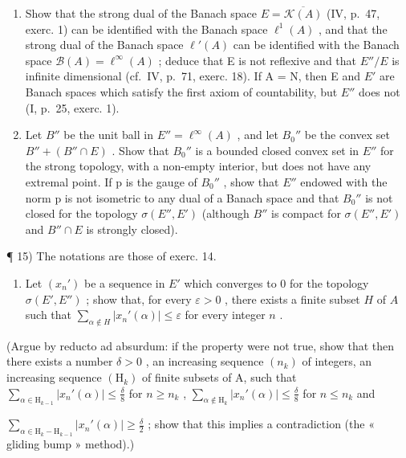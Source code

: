 \begin{enumerate}
\def\labelenumi{\alph{enumi})}
\tightlist
\item
  Show that the strong dual of the Banach space \(E = \overline{\mathcal{K}(A)}\) (IV, p.~47, exerc. 1) can be identified with the Banach space \(\ell^{1}(A)\) , and that the strong dual of the Banach space \(\ell'(A)\) can be identified with the Banach space \(\mathcal{B}(A) = \ell^{\infty}(A)\) ; deduce that E is not reflexive and that \(E''/E\) is infinite dimensional (cf.~IV, p.~71, exerc. 18). If A = N, then E and \(E'\) are Banach spaces which satisfy the first axiom of countability, but \(E''\) does not (I, p.~25, exerc. 1).
\item
  Let \(B''\) be the unit ball in \(E'' = \ell^{\infty}(A)\) , and let \(B_{0}''\) be the convex set \(B'' + (B'' \cap E)\) . Show that \(B_{0}''\) is a bounded closed convex set in \(E''\) for the strong topology, with a non-empty interior, but does not have any extremal point. If p is the gauge of \(B_{0}''\) , show that \(E''\) endowed with the norm p is not isometric to any dual of a Banach space and that \(B_{0}''\) is not closed for the topology \(\sigma(E'', E')\) (although \(B''\) is compact for \(\sigma(E'', E')\) and \(B'' \cap E\) is strongly closed).
\end{enumerate}

¶ 15) The notations are those of exerc. 14.

\begin{enumerate}
\def\labelenumi{\alph{enumi})}
\tightlist
\item
  Let \((x_n')\) be a sequence in \(E'\) which converges to 0 for the topology \(\sigma(E', E'')\) ; show that, for every \(\varepsilon > 0\) , there exists a finite subset \(H\) of \(A\) such that \(\sum_{\alpha \notin H} |x_n'(\alpha)| \leqslant \varepsilon\) for every integer \(n\) .
\end{enumerate}

(Argue by reducto ad absurdum: if the property were not true, show that then there exists a number \(\delta > 0\) , an increasing sequence \((n_k)\) of integers, an increasing sequence \((\mathrm{H}_k)\) of finite subsets of A, such that \(\sum_{\alpha \in \mathrm{H}_{k-1}} |x_n'(\alpha)| \leqslant \frac{\delta}{8}\) for \(n \geqslant n_k\) , \(\sum_{\alpha \notin \mathrm{H}_k} |x_n'(\alpha)| \leqslant \frac{\delta}{8}\) for \(n \leqslant n_k\) and

\(\sum_{\alpha \in \mathrm{H}_k - \mathrm{H}_{k-1}} |x_n'(\alpha)| \geqslant \frac{\delta}{2}\) ; show that this implies a contradiction (the « gliding bump » method).)

